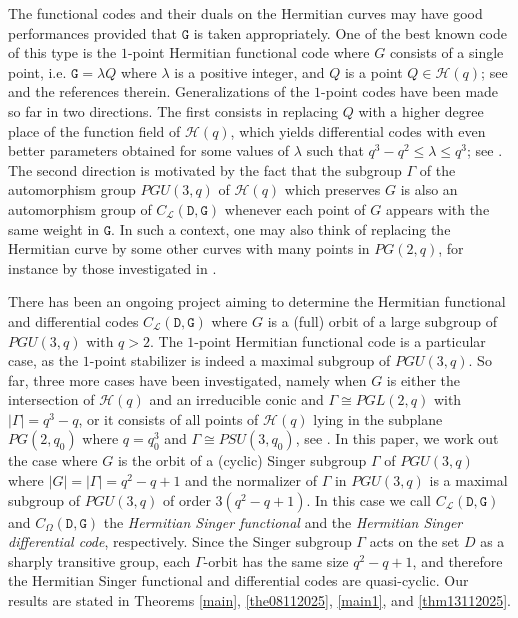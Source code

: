 \documentclass[9pt]{article}
\theoremstyle{plain}
\begin{document}
The functional codes and their duals on the Hermitian curves may have good performances provided that $\mathtt{G}$  is taken appropriately. One of the best known code of this type is the $1$-point Hermitian functional code where $G$ consists of a single point, i.e. $\mathtt{G}=\lambda Q$ where $\lambda$ is a positive integer, and $Q$ is a point $Q\in {\mathcal{H}}(q)$; see \cite{br} and the references therein.  Generalizations of the $1$-point codes have been made so far in two directions. The first consists in replacing $Q$ with a higher degree place of the function field of ${\mathcal{H}}(q)$, which yields differential codes with even better parameters obtained for some values of $\lambda$ such that $q^3-q^2\leq\lambda\leq q^3$; see \cite{CT,KN1,KN2,M}. The second direction is motivated by the fact that the subgroup $\Gamma$ of the automorphism group $PGU(3,q)$ of ${\mathcal{H}}(q)$ which preserves $G$ is also an automorphism group of $C_{\mathcal{L}}(\mathtt{D},\mathtt{G})$ whenever each point of $G$ appears with the same weight in $\mathtt{G}$. In such a context, one may also think of replacing the Hermitian curve by some other curves with many points in $PG(2,q)$, for instance by those investigated in \cite{HK1,HK2,HK3}.   

There has been an ongoing project aiming to determine the Hermitian functional and differential codes $C_{\mathcal{L}}(\mathtt{D},\mathtt{G})$ where $G$ is a (full) orbit of a large subgroup of $PGU(3,q)$ with $q>2$. The $1$-point Hermitian functional code is a particular case, as the $1$-point stabilizer is indeed a maximal subgroup of $PGU(3,q)$. So far, three more cases have been investigated, namely when $G$ is either 
the intersection of ${\mathcal{H}}(q)$ and an irreducible conic and $\Gamma\cong PGL(2,q)$ with $|\Gamma|=q^3-q$, or it consists of all points of ${\mathcal{H}}(q)$ lying in the subplane $PG(2,q_0)$ where $q=q_0^3$ and $\Gamma\cong PSU(3,q_0)$, see \cite{KNT, KS}. In this paper, we work out the case where $G$ is the orbit of a (cyclic) Singer subgroup $\Gamma$ of $PGU(3,q)$ where $|G|=|\Gamma|=q^2-q+1$ and the normalizer of $\Gamma$ in $PGU(3,q)$ is a maximal subgroup of $PGU(3,q)$ of order $3(q^2-q+1)$. In this case we call $C_{\mathcal{L}}(\mathtt{D},\mathtt{G})$ and $C_{\Omega}(\mathtt{D},\mathtt{G})$  the \emph{Hermitian Singer functional} and the \emph{Hermitian Singer differential code}, respectively. Since the Singer subgroup $\Gamma$ acts on the set $D$ as a sharply transitive group, each $\Gamma$-orbit has the same size $q^2-q+1$, and therefore the Hermitian Singer functional and differential codes are quasi-cyclic.   
Our results are stated in Theorems \ref{main}, \ref{the08112025}, \ref{main1},  and \ref{thm13112025}. 
\end{document}
